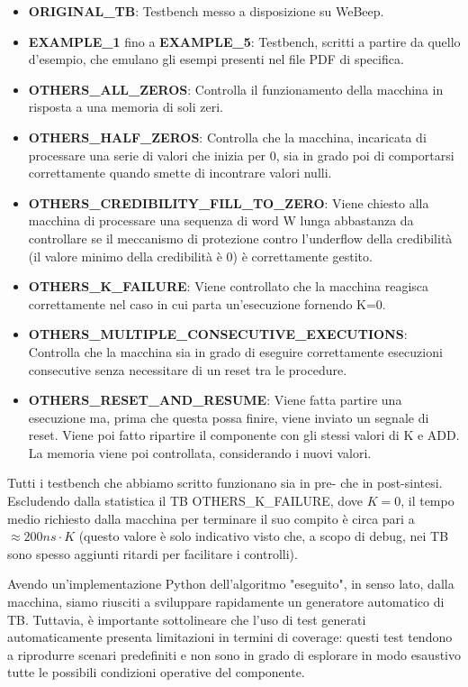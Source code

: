 \documentclass[a4paper]{article}
\begin{document}
\begin{itemize}
    \item \textbf{ORIGINAL\_TB}: Testbench messo a disposizione su WeBeep.
    \item \textbf{EXAMPLE\_1} fino a \textbf{EXAMPLE\_5}: Testbench, scritti a partire da quello d’esempio, che emulano gli esempi presenti nel file PDF di specifica.
    \item \textbf{OTHERS\_ALL\_ZEROS}: Controlla il funzionamento della macchina in risposta a una memoria di soli zeri.
    \item \textbf{OTHERS\_HALF\_ZEROS}: Controlla che la macchina, incaricata di processare una serie di valori che inizia per 0, sia in grado poi di comportarsi correttamente quando smette di incontrare valori nulli.
    \item \textbf{OTHERS\_CREDIBILITY\_FILL\_TO\_ZERO}: Viene chiesto alla macchina di processare una sequenza di word W lunga abbastanza da controllare se il meccanismo di protezione contro l’underflow della credibilità (il valore minimo della credibilità è 0) è correttamente gestito.
    \item \textbf{OTHERS\_K\_FAILURE}: Viene controllato che la macchina reagisca correttamente nel caso in cui parta un’esecuzione fornendo K=0.
    \item \textbf{OTHERS\_MULTIPLE\_CONSECUTIVE\_EXECUTIONS}: Controlla che la macchina sia in grado di eseguire correttamente esecuzioni consecutive senza necessitare di un reset tra le procedure.
    \item \textbf{OTHERS\_RESET\_AND\_RESUME}: Viene fatta partire una esecuzione ma, prima che questa possa finire, viene inviato un segnale di reset. Viene poi fatto ripartire il componente con gli stessi valori di K e ADD. La memoria viene poi controllata, considerando i nuovi valori.
\end{itemize}

Tutti i testbench che abbiamo scritto funzionano sia in pre- che in post-sintesi. Escludendo dalla statistica il TB OTHERS\_K\_FAILURE, dove $K=0$, il tempo medio richiesto dalla macchina per terminare il suo compito è circa pari a $\approx 200ns \cdot K$ (questo valore è solo indicativo visto che, a scopo di debug, nei TB sono spesso aggiunti ritardi per facilitare i controlli).

Avendo un'implementazione Python dell'algoritmo "eseguito", in senso lato, dalla macchina, siamo riusciti a sviluppare rapidamente un generatore automatico di TB. Tuttavia, è importante sottolineare che l'uso di test generati automaticamente presenta limitazioni in termini di coverage: questi test tendono a riprodurre scenari predefiniti e non sono in grado di esplorare in modo esaustivo tutte le possibili condizioni operative del componente.
\end{document}
